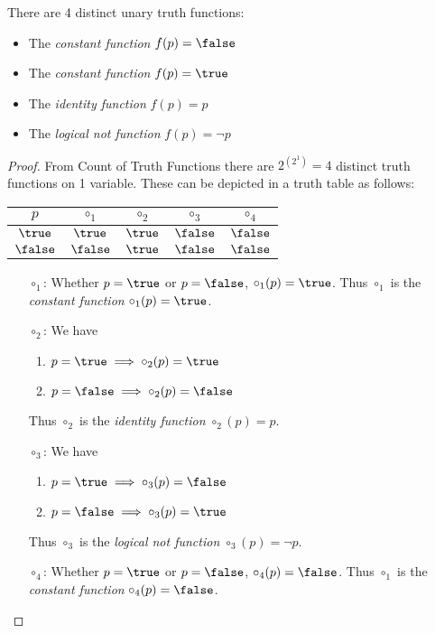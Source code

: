 \begin{tcolorbox}[colframe=corcolor,title={\color{white}\bf Unary Truth Functions}]
	\begin{corollary}
		There are 4 distinct unary truth functions:
		\begin{itemize}
			\item The \textit{constant function} $f(p)=\false$
			\item The \textit{constant function} $f(p)=\true$
			\item The \textit{identity function} $f(p)=p$
			\item The \textit{logical not function} $f(p)=\lnot p$
		\end{itemize}
	\end{corollary}
\end{tcolorbox}
\begin{proof}
From Count of Truth Functions there are $2^{(2^1)}=4$
distinct truth functions on 1 variable. These can be depicted in a truth table as follows:
\begin{table}[h!]\centering
\begin{tabular}{|c|cccc|}
\hline
$p$ & $\circ_1$ & $\circ_2$ & $\circ_3$ & $\circ_4$ \\
\hline
$\true$ & $\true$ & $\true$ & $\false$ & $\false$ \\
$\false$ & $\false$ & $\true$ & $\false$ & $\false$ \\
\hline
\end{tabular}
\end{table}
\begin{itemize}
	\item[$\circ_1$:] Whether $p=\true$ or $p=\false$, $\circ_1(p)=\true$. Thus $\circ_1$ is the \textit{constant function} $\circ_1(p)=\true$.
	\item[$\circ_2$:] We have \begin{enumerate}[(1)]
		\item $p=\true\implies\circ_2(p)=\true$
		\item $p=\false\implies\circ_2(p)=\false$
	\end{enumerate} Thus $\circ_2$ is the \textit{identity function} $\circ_2(p)=p$.
	\item[$\circ_3$:] We have \begin{enumerate}[(1)]
		\item $p=\true\implies\circ_3(p)=\false$
		\item $p=\false\implies\circ_3(p)=\true$
	\end{enumerate} Thus $\circ_3$ is the \textit{logical not function} $\circ_3(p)=\lnot p$.
	\item[$\circ_4$:] Whether $p=\true$ or $p=\false$, $\circ_4(p)=\false$. Thus $\circ_1$ is the \textit{constant function} $\circ_4(p)=\false$.
\end{itemize}
\end{proof}

